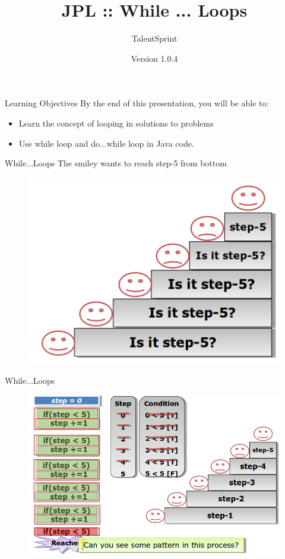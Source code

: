 \documentclass[14pt]{beamer}
\title[JPL:Java:01]{JPL :: While ... Loops}
\author[TS]{TalentSprint}
\institute[L\&D]{Licensed To Skill}
\date{Version 1.0.4}
\begin{document}
\begin{frame}
  \titlepage
\end{frame}

\begin{frame}{Learning Objectives}
By the end of this presentation, you will be able to:
  \begin{itemize}
  \item Learn the concept of looping in solutions to problems

  \item Use while loop and do...while loop in Java code.

  \end{itemize}
\end{frame}


\begin{frame}{While...Loops}
 The smiley wants to reach step-5 from bottom
\begin{figure}[H]
\begin{center}
\includegraphics[scale=.4]{smiley.png}
\end{center}
\end{figure}
\end{frame}


\begin{frame}{While...Loops}
\begin{figure}[H]
\begin{center}
\includegraphics[scale=.4]{while-smiley.png}
\end{center}
\end{figure}
\end{frame}
\end{document}
